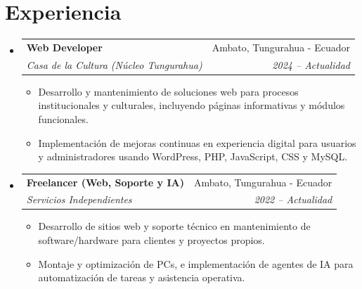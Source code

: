 \documentclass[letterpaper,11pt]{article}
\makeatletter
\newcommand{\resumeItem}[1]{
  \item\small{
    {#1 \vspace{-2pt}}
  }
}
\newcommand{\resumeSubheading}[4]{
  \vspace{-2pt}\item
    \begin{tabular*}{0.97\textwidth}[t]{l@{\extracolsep{\fill}}r}
      \textbf{#1} & #2 \\
      \textit{\small#3} & \textit{\small #4} \\
    \end{tabular*}\vspace{-7pt}
}
\newcommand{\resumeSubHeadingListStart}{\begin{itemize}[leftmargin=0.15in, label={}]}
\newcommand{\resumeSubHeadingListEnd}{\end{itemize}}
\newcommand{\resumeItemListStart}{\begin{itemize}}
\newcommand{\resumeItemListEnd}{\end{itemize}\vspace{-5pt}}
\makeatother
\begin{document}
\section{Experiencia}
  \resumeSubHeadingListStart
    \resumeSubheading
      {Web Developer}{Ambato, Tungurahua - Ecuador}
      {Casa de la Cultura (Núcleo Tungurahua)}{2024 -- Actualidad}
      \resumeItemListStart
        \resumeItem{Desarrollo y mantenimiento de soluciones web para procesos institucionales y culturales, incluyendo páginas informativas y módulos funcionales.}
        \resumeItem{Implementación de mejoras continuas en experiencia digital para usuarios y administradores usando WordPress, PHP, JavaScript, CSS y MySQL.}
      \resumeItemListEnd

    \resumeSubheading
      {Freelancer (Web, Soporte y IA)}{Ambato, Tungurahua - Ecuador}
      {Servicios Independientes}{2022 -- Actualidad}
      \resumeItemListStart
        \resumeItem{Desarrollo de sitios web y soporte técnico en mantenimiento de software/hardware para clientes y proyectos propios.}
        \resumeItem{Montaje y optimización de PCs, e implementación de agentes de IA para automatización de tareas y asistencia operativa.}
      \resumeItemListEnd
  \resumeSubHeadingListEnd
\end{document}
